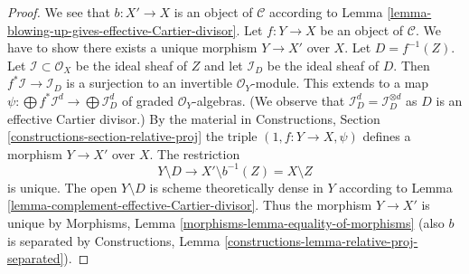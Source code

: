 \documentclass[10pt,a4paper]{amsart}
\theoremstyle{plain}
\theoremstyle{definition}
\theoremstyle{remark}
\numberwithin{equation}{subsection}
\begin{document}
\begin{proof}
We see that $b : X' \to X$ is an object of $\mathcal{C}$ according to
Lemma \ref{lemma-blowing-up-gives-effective-Cartier-divisor}.
Let $f : Y \to X$ be an object of $\mathcal{C}$. We have to show there exists
a unique morphism $Y \to X'$ over $X$. Let $D = f^{-1}(Z)$.
Let $\mathcal{I} \subset \mathcal{O}_X$ be the ideal sheaf of $Z$
and let $\mathcal{I}_D$ be the ideal sheaf of $D$. Then
$f^*\mathcal{I} \to \mathcal{I}_D$ is a surjection
to an invertible $\mathcal{O}_Y$-module. This extends to a map
$\psi : \bigoplus f^*\mathcal{I}^d \to \bigoplus \mathcal{I}_D^d$
of graded $\mathcal{O}_Y$-algebras. (We observe that
$\mathcal{I}_D^d = \mathcal{I}_D^{\otimes d}$ as $D$ is an
effective Cartier divisor.) By the material in
Constructions, Section \ref{constructions-section-relative-proj}
the triple $(1, f : Y \to X, \psi)$ defines a morphism $Y \to X'$ over $X$.
The restriction
$$
Y \setminus D \longrightarrow X' \setminus b^{-1}(Z) = X \setminus Z
$$
is unique. The open $Y \setminus D$ is scheme theoretically dense in $Y$
according to Lemma \ref{lemma-complement-effective-Cartier-divisor}.
Thus the morphism $Y \to X'$ is unique by
Morphisms, Lemma \ref{morphisms-lemma-equality-of-morphisms}
(also $b$ is separated by Constructions, Lemma
\ref{constructions-lemma-relative-proj-separated}).
\end{proof}
\end{document}
